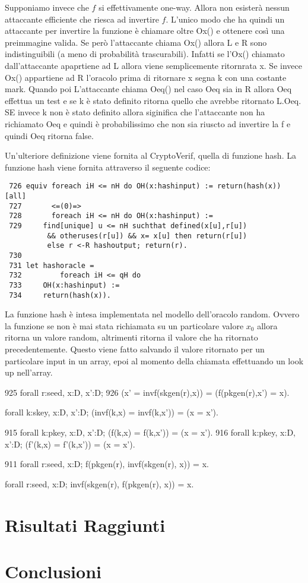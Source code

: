 \documentclass[a4paper,openright,twoside,12pt]{report}
\begin{document}
Supponiamo invece che $f$ si effettivamente one-way. Allora non esister\`a nessun attaccante efficiente che riesca ad invertire $f$. L'unico modo che ha quindi un attaccante
per invertire la funzione \`e chiamare oltre Ox() e ottenere cos\`i una preimmagine valida. Se però l'attaccante chiama Ox() allora L e R sono indistinguibili (a meno di probabilit\`a trascurabili).
Infatti se l'Ox() chiamato dall'attaccante apaprtiene ad L allora viene semplicemente ritornrata x. Se invece Ox() appartiene ad R l'oracolo prima di ritornare x segna k con una costante mark.
Quando poi L'attaccante chiama Oeq() nel caso Oeq sia in R allora Oeq effettua un test e se k \`e stato definito ritorna quello che avrebbe ritornato L.Oeq. SE invece k non \`e stato definito
allora siginifica che l'attaccante non ha richiamato Oeq e quindi \`e probabilissimo che non sia riuscto ad invertire la f e quindi Oeq ritorna false.

Un'ulteriore definizione viene fornita al CryptoVerif, quella di funzione hash. La funzione hash viene fornita attraverso il seguente codice:
\begin{center}
 \begin{verbatim}
 726 equiv foreach iH <= nH do OH(x:hashinput) := return(hash(x)) [all]
 727       <=(0)=>
 728       foreach iH <= nH do OH(x:hashinput) :=
 729     find[unique] u <= nH suchthat defined(x[u],r[u]) 
	      && otheruses(r[u]) && x= x[u] then return(r[u]) 
	      else r <-R hashoutput; return(r).
 730 
 731 let hashoracle =
 732         foreach iH <= qH do
 733     OH(x:hashinput) :=
 734     return(hash(x)).
 \end{verbatim}
\end{center}

La funzione hash \`e intesa implementata nel modello dell'oracolo random. Ovvero la funzione se non \`e mai stata richiamata su un particolare valore $x_0$ allora ritorna un
valore random, altrimenti ritorna il valore che ha ritornato precedentemente. Questo viene fatto salvando il valore ritornato per un particolare input in un array, epoi
al momento della chiamata effettuando un look up nell'array.


 925 forall r:seed, x:D, x':D;
 926     (x' = invf(skgen(r),x)) = (f(pkgen(r),x') = x).



forall k:skey, x:D, x':D; (invf(k,x) = invf(k,x')) = (x = x').

 915 forall k:pkey, x:D, x':D; (f(k,x) = f(k,x')) = (x = x').
 916 forall k:pkey, x:D, x':D; (f'(k,x) = f'(k,x')) = (x = x').


 911 forall r:seed, x:D; f(pkgen(r), invf(skgen(r), x)) = x.

forall r:seed, x:D; invf(skgen(r), f(pkgen(r), x)) = x.



\chapter{Risultati Raggiunti}
\chapter{Conclusioni}
\lhead[\fancyplain{}{\bfseries\thepage}]{\fancyplain{}{\bfseries\rightmark}}
	
		
\end{document}
